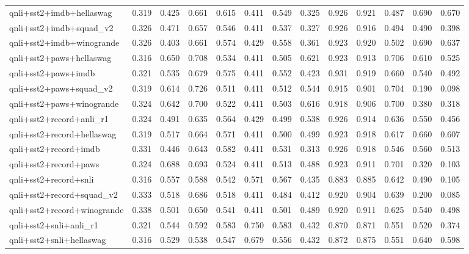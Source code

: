 \begin{table}[t]
\begin{tabular}{lrrrrrrrrrrrr}
    qnli+sst2+imdb+hellaswag & 0.319 & 0.425 & 0.661 & 0.615 & 0.411 & 0.549 & 0.325 & 0.926 & 0.921 & 0.487 & 0.690 & 0.670 \\
    qnli+sst2+imdb+squad\_v2 & 0.326 & 0.471 & 0.657 & 0.546 & 0.411 & 0.537 & 0.327 & 0.926 & 0.916 & 0.494 & 0.490 & 0.398 \\
    qnli+sst2+imdb+winogrande & 0.326 & 0.403 & 0.661 & 0.574 & 0.429 & 0.558 & 0.361 & 0.923 & 0.920 & 0.502 & 0.690 & 0.637 \\
    qnli+sst2+paws+hellaswag & 0.316 & 0.650 & 0.708 & 0.534 & 0.411 & 0.505 & 0.621 & 0.923 & 0.913 & 0.706 & 0.610 & 0.525 \\
    qnli+sst2+paws+imdb & 0.321 & 0.535 & 0.679 & 0.575 & 0.411 & 0.552 & 0.423 & 0.931 & 0.919 & 0.660 & 0.540 & 0.492 \\
    qnli+sst2+paws+squad\_v2 & 0.319 & 0.614 & 0.726 & 0.511 & 0.411 & 0.512 & 0.544 & 0.915 & 0.901 & 0.704 & 0.190 & 0.098 \\
    qnli+sst2+paws+winogrande & 0.324 & 0.642 & 0.700 & 0.522 & 0.411 & 0.503 & 0.616 & 0.918 & 0.906 & 0.700 & 0.380 & 0.318 \\
    qnli+sst2+record+anli\_r1 & 0.324 & 0.491 & 0.635 & 0.564 & 0.429 & 0.499 & 0.538 & 0.926 & 0.914 & 0.636 & 0.550 & 0.456 \\
    qnli+sst2+record+hellaswag & 0.319 & 0.517 & 0.664 & 0.571 & 0.411 & 0.500 & 0.499 & 0.923 & 0.918 & 0.617 & 0.660 & 0.607 \\
    qnli+sst2+record+imdb & 0.331 & 0.446 & 0.643 & 0.582 & 0.411 & 0.531 & 0.313 & 0.926 & 0.918 & 0.546 & 0.560 & 0.513 \\
    qnli+sst2+record+paws & 0.324 & 0.688 & 0.693 & 0.524 & 0.411 & 0.513 & 0.488 & 0.923 & 0.911 & 0.701 & 0.320 & 0.103 \\
    qnli+sst2+record+snli & 0.316 & 0.557 & 0.588 & 0.542 & 0.571 & 0.567 & 0.435 & 0.883 & 0.885 & 0.642 & 0.490 & 0.105 \\
    qnli+sst2+record+squad\_v2 & 0.333 & 0.518 & 0.686 & 0.518 & 0.411 & 0.484 & 0.412 & 0.920 & 0.904 & 0.639 & 0.200 & 0.085 \\
    qnli+sst2+record+winogrande & 0.338 & 0.501 & 0.650 & 0.541 & 0.411 & 0.501 & 0.489 & 0.920 & 0.911 & 0.625 & 0.540 & 0.498 \\
    qnli+sst2+snli+anli\_r1 & 0.321 & 0.544 & 0.592 & 0.583 & 0.750 & 0.583 & 0.432 & 0.870 & 0.871 & 0.551 & 0.520 & 0.374 \\
    qnli+sst2+snli+hellaswag & 0.316 & 0.529 & 0.538 & 0.547 & 0.679 & 0.556 & 0.432 & 0.872 & 0.875 & 0.551 & 0.640 & 0.598 \\

\end{tabular}
\end{table}
